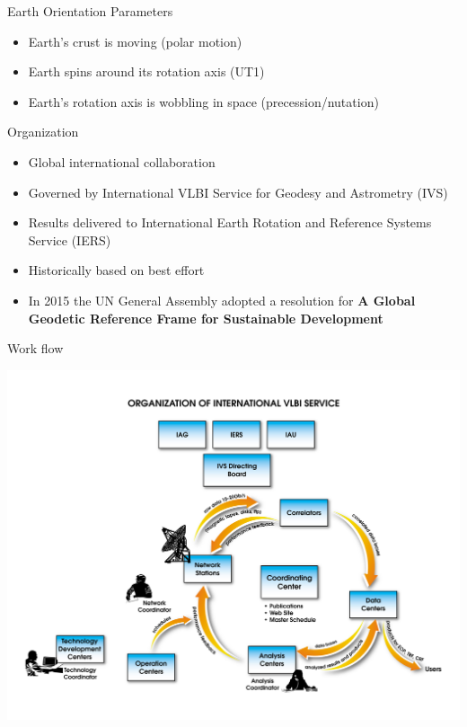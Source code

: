 \documentclass[14pt,table,t, c]{beamer}
\begin{document}
\begin{frame}{Earth Orientation Parameters}
\begin{itemize}
\item Earth's crust is moving (polar motion)
\item Earth spins around its rotation axis (UT1)
\item Earth's rotation axis is wobbling in space (precession/nutation)
\end{itemize}
\end{frame}


\begin{frame}{Organization}
\begin{itemize}
\item Global international collaboration 
\item Governed by International VLBI Service for Geodesy and Astrometry (IVS)
\item Results delivered to International Earth Rotation and Reference
Systems Service (IERS)
\item Historically based on best effort
\item In 2015 the UN General Assembly adopted a resolution for \textbf{A Global Geodetic Reference Frame for
Sustainable Development}
\end{itemize}
\end{frame}

\begin{frame}{Work flow}
\begin{center}
	\includegraphics[height=0.8\textheight]{figure/IVS_flow}
\end{center}
\end{frame}
\end{document}
